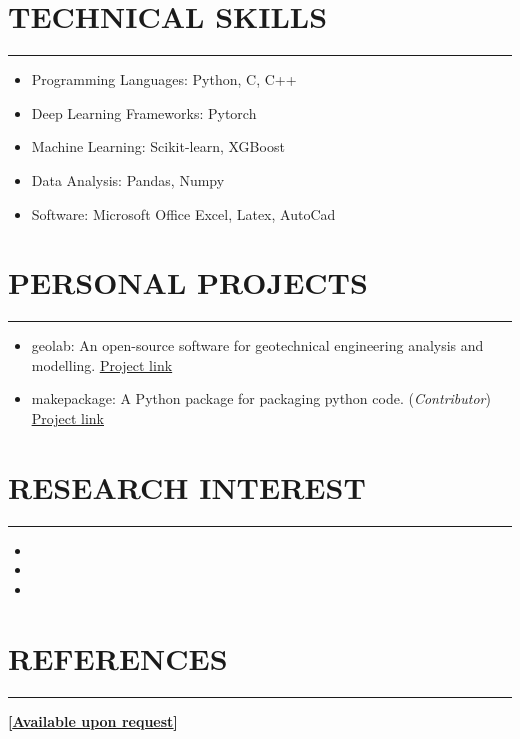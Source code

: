 \documentclass[letterpaper, 12pt]{article}
\newcommand{\cvsection}[1]{
	
	\section*{#1}	
	\rule[20pt]{\linewidth}{0.5pt} %

}
\newcommand{\itemizeMargin}{11pt}
\begin{document}
	\cvsection{TECHNICAL SKILLS}
	
	\begin{itemize}[leftmargin=\itemizeMargin]
		\item Programming Languages: Python, C, C++
		\item Deep Learning Frameworks: Pytorch
		\item Machine Learning: Scikit-learn, XGBoost
		\item Data Analysis: Pandas, Numpy
		\item Software: Microsoft Office Excel, Latex, AutoCad
	\end{itemize}
	
	
	\cvsection{PERSONAL PROJECTS}
	
	\begin{itemize}[leftmargin=\itemizeMargin]
		\item geolab: An open-source software for geotechnical engineering analysis and modelling. \href{https://www.github.com/patrickboateng/geolab}{\underline{Project link}}
		
		\item makepackage: A Python package for packaging python code. (\textit{Contributor})
		\href{https://github.com/nyggus/makepackage}{\underline{Project link}}
	\end{itemize}
	
	
	\cvsection{RESEARCH INTEREST}
	
	\begin{itemize}[leftmargin=\itemizeMargin]
		\item 
		\item 
		\item 
	\end{itemize}
	
	
	\cvsection{REFERENCES}
	
	\textbf{[\href{mailto:boatengpatrick456@gmail.com}{\underline{Available upon request}}]}
\end{document}
